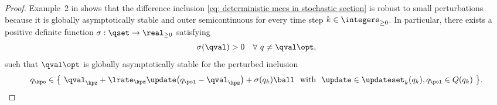 \begin{proof}
    Example~2 in \citep{Kellett2007SufficientInclusions} shows that the difference inclusion \eqref{eq: deterministic mces in stochastic section} is robust to small perturbations because it is globally asymptotically stable and outer semicontinuous for every time step $k \in \integers_{\geq 0}$.
    In particular, there exists a positive definite function $\sigma : \qset \to \real_{\geq 0}$ satisfying
    \begin{align*}
        \sigma(\qval)>0 \quad \forall \ q \neq \qval\opt ,
    \end{align*}
    such that $\qval\opt$ is globally asymptotically stable for the perturbed inclusion
    \begin{align}
        q_\kpo
        \in
        \big\{ \ \qval_\kpz + \lrate_\kpz \update \big( q_{\pol} - \qval_\kpz \big) + \sigma(q_k) \Bar{\ball}
        \ \text{ with } \
        \update \in \updateset_k(q_k),
        q_{\pol} \in Q(q_k)
        \ \big\} .
    \end{align}

\end{proof}
